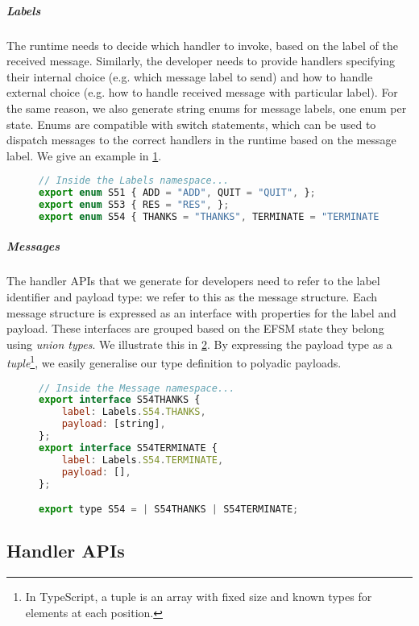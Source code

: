 \subparagraph{Labels}
The runtime needs to decide which handler to invoke, based
on the label of the received message. Similarly, the developer needs
to provide handlers specifying their internal choice (e.g. which
message label to send) and how to handle external choice (e.g. 
how to handle received message with particular label).
For the same reason, we also generate string enums for message labels,
one enum per state. Enums are compatible with switch statements,
which can be used to dispatch messages to the correct handlers
in the runtime based on the message label. 
We give an example in \cref{lst:nodeefsmlabels}.

\begin{figure}[!ht]
\begin{lstlisting}[language=javascript,tabsize=2]
// Inside the Labels namespace...
export enum S51 { ADD = "ADD", QUIT = "QUIT", };
export enum S53 { RES = "RES", };
export enum S54 { THANKS = "THANKS", TERMINATE = "TERMINATE", };
\end{lstlisting}
\label{lst:nodeefsmlabels}
\end{figure}

\subparagraph{Messages}
The handler APIs that we generate for developers
need to refer to the label identifier and payload type: 
we refer to this as the message structure.
Each message structure is expressed as an interface with
properties for the label and payload.
These interfaces are grouped based on the EFSM state
they belong using \textit{union types}.
We illustrate this in \cref{lst:addersvrmsg}.
By expressing the payload type as a \textit{tuple}\footnote{
In TypeScript, a tuple is an array with fixed size
and known types for elements at each position.
},
we easily generalise our type definition to polyadic payloads.

\begin{figure}[!ht]
\begin{lstlisting}[language=javascript]
// Inside the Message namespace...
export interface S54THANKS {
	label: Labels.S54.THANKS,
	payload: [string],
};
export interface S54TERMINATE {
	label: Labels.S54.TERMINATE,
	payload: [],
};

export type S54 = | S54THANKS | S54TERMINATE;
\end{lstlisting}
\label{lst:addersvrmsg}
\end{figure}

\subsection{Handler APIs}
\label{subsection:nodeefsmhandlers}

